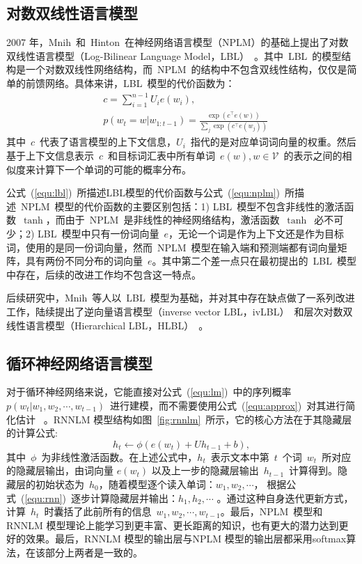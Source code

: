 \subsection{对数双线性语言模型}
2007 年，Mnih~和~Hinton~在神经网络语言模型（NPLM）的基础上提出了对数双线性语言模型（Log-Bilinear Language Model，LBL）~。其中~LBL~的模型结构是一个对数双线性网络结构，而~NPLM~的结构中不包含双线性结构，仅仅是简单的前馈网络。具体来讲，LBL~模型的代价函数为：
\begin{equation}
\label{equ:lbl}
\begin{split}
   &c=\sum_{i=1}^{n-1}{U_i e({w_i})}, \\
   &p(w_t=w|w_{1:t-1})=\frac{\exp(c^\top e(w))}{\sum_j{\exp(c^\top e(w_j))}}
\end{split}
\end{equation}
其中~$c$~代表了语言模型的上下文信息，$U_i$~指代的是对应单词词向量的权重。然后基于上下文信息表示~$c$~和目标词汇表中所有单词~$e(w),w\in \mathcal{V}$~的表示之间的相似度来计算下一个单词的可能的概率分布。

公式~(\ref{equ:lbl})~所描述LBL模型的代价函数与公式~(\ref{equ:nplm})~所描述~NPLM~模型的代价函数的主要区别包括：1) LBL~模型不包含非线性的激活函数~$\tanh$，而由于~NPLM~是非线性的神经网络结构，激活函数~$\tanh$~必不可少；2) LBL~模型中只有一份词向量~$e$，无论一个词是作为上下文还是作为目标词，使用的是同一份词向量，然而~NPLM~模型在输入端和预测端都有词向量矩阵，具有两份不同分布的词向量~$e$。其中第二个差一点只在最初提出的~LBL~模型中存在，后续的改进工作均不包含这一特点。

后续研究中，Mnih~等人以~LBL~模型为基础，并对其中存在缺点做了一系列改进工作，陆续提出了逆向量语言模型（inverse vector LBL，ivLBL）~和层次对数双线性语言模型（Hierarchical LBL，HLBL）~。

\subsection{循环神经网络语言模型}
对于循环神经网络来说，它能直接对公式~(\ref{equ:lm})~中的序列概率~$p(w_t | w_1,w_2,\cdots,w_{t-1})$~进行建模，而不需要使用公式~(\ref{equ:approx})~对其进行简化估计~ 。RNNLM 模型结构如图~\ref{fig:rnnlm}~所示，它的核心方法在于其隐藏层的计算公式:
\begin{equation}
\label{equ:rnn}
  h_t \leftarrow  \phi(e(w_t) + U h_{t-1} +b),
\end{equation}
其中~$\phi$~为非线性激活函数。在上述公式中，$h_t$~表示文本中第~$t$~个词~$w_t$~所对应的隐藏层输出，由词向量 $e(w_t)$ 以及上一步的隐藏层输出~$h_{t -1}$~计算得到。隐藏层的初始状态为~$h_0$，随着模型逐个读入单词：$w_1,w_2,\cdots$， 根据公式~(\ref{equ:rnn})~逐步计算隐藏层并输出：$h_1,h_2,\cdots$ 。通过这种自身迭代更新方式，计算~$h_t$~时囊括了此前所有的信息~$w_1,w_2,\cdots,w_{t-1}$。最后，NPLM~模型和RNNLM 模型理论上能学习到更丰富、更长距离的知识，也有更大的潜力达到更好的效果。最后，RNNLM 模型的输出层与NPLM 模型的输出层都采用softmax算法，在该部分上两者是一致的。

